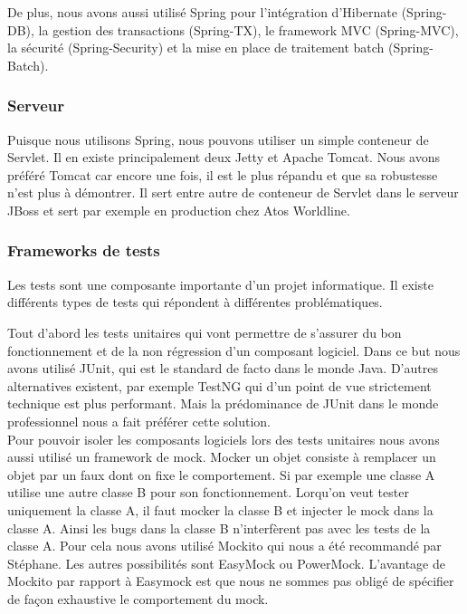 De plus, nous avons aussi utilisé Spring pour l'intégration d'Hibernate (Spring-DB), la gestion des transactions (Spring-TX), le framework MVC (Spring-MVC), la sécurité (Spring-Security) et la mise en place de traitement batch (Spring-Batch). 

\subsubsection{Serveur}

Puisque nous utilisons Spring, nous pouvons utiliser un simple conteneur de Servlet. Il en existe principalement deux Jetty et Apache Tomcat. Nous avons préféré Tomcat car encore une fois, il est le plus répandu et que sa robustesse n'est plus à démontrer. Il sert entre autre de conteneur de Servlet dans le serveur JBoss et sert par exemple en production chez Atos Worldline. 

\subsubsection{Frameworks de tests}

Les tests sont une composante importante d'un projet informatique. Il existe différents types de tests qui répondent à différentes problématiques.

Tout d'abord les tests unitaires qui vont permettre de s'assurer du bon fonctionnement et de la non régression d'un composant logiciel. Dans ce but nous avons utilisé JUnit, qui est le standard de facto dans le monde Java. D'autres alternatives existent, par exemple TestNG qui d'un point de vue strictement technique est plus performant. Mais la prédominance de JUnit dans le monde professionnel nous a fait préférer cette solution.\\

Pour pouvoir isoler les composants logiciels lors des tests unitaires nous avons aussi utilisé un framework de mock. Mocker un objet consiste à remplacer un objet par un faux dont on fixe le comportement. Si par exemple une classe A utilise une autre classe B pour son fonctionnement. Lorqu'on veut tester uniquement la classe A, il faut mocker la classe B et injecter le mock dans la classe A. Ainsi les bugs dans la classe B n'interfèrent pas avec les tests de la classe A. Pour cela nous avons utilisé Mockito qui nous a été recommandé par Stéphane. Les autres possibilités sont EasyMock ou PowerMock. L'avantage de Mockito par rapport à Easymock est que nous ne sommes pas obligé de spécifier de façon exhaustive le comportement du mock.\\

